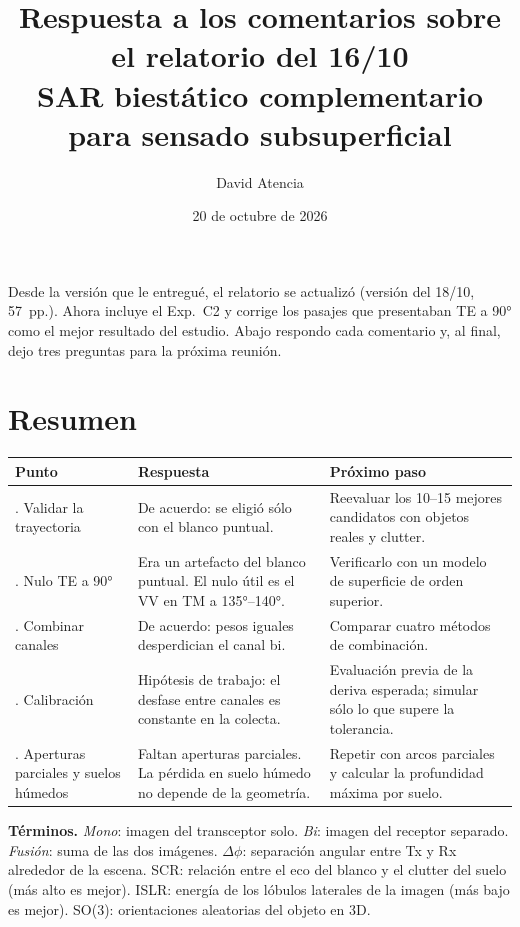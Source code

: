 \documentclass[11pt,a4paper]{article}
\title{\vspace{-1.5cm}\textbf{Respuesta a los comentarios sobre el relatorio del 16/10}\\[2pt]
\large SAR biestático complementario para sensado subsuperficial}
\author{David Atencia}
\date{20 de octubre de 2026}
\begin{document}
\maketitle
\vspace{-0.6cm}

Desde la versión que le entregué, el relatorio se actualizó (versión del 18/10, 57~pp.).
Ahora incluye el Exp.~C2 y corrige los pasajes que presentaban TE a 90° como el mejor
resultado del estudio. Abajo respondo cada comentario y, al final, dejo tres preguntas para
la próxima reunión.

\section*{Resumen}

\begin{tabularx}{\linewidth}{@{}>{\raggedright\arraybackslash}p{3.3cm}LL@{}}
\toprule
Punto & Respuesta & Próximo paso \\
. Validar la trayectoria &
De acuerdo: se eligió sólo con el blanco puntual. &
Reevaluar los 10--15 mejores candidatos con objetos reales y clutter. \\
. Nulo TE a 90° &
Era un artefacto del blanco puntual. El nulo útil es el VV en TM a 135°--140°. &
Verificarlo con un modelo de superficie de orden superior. \\
. Combinar canales &
De acuerdo: pesos iguales desperdician el canal bi. &
Comparar cuatro métodos de combinación. \\
. Calibración &
Hipótesis de trabajo: el desfase entre canales es constante en la colecta. &
Evaluación previa de la deriva esperada; simular sólo lo que supere la tolerancia. \\
. Aperturas parciales y suelos húmedos &
Faltan aperturas parciales. La pérdida en suelo húmedo no depende de la geometría. &
Repetir con arcos parciales y calcular la profundidad máxima por suelo. \\
\bottomrule
\end{tabularx}

\medskip
\noindent\textbf{Términos.}
\emph{Mono}: imagen del transceptor solo. \emph{Bi}: imagen del receptor separado.
\emph{Fusión}: suma de las dos imágenes.
$\Delta\phi$: separación angular entre Tx y Rx alrededor de la escena.
SCR: relación entre el eco del blanco y el clutter del suelo (más alto es mejor).
ISLR: energía de los lóbulos laterales de la imagen (más bajo es mejor).
SO(3): orientaciones aleatorias del objeto en 3D.
\end{document}

